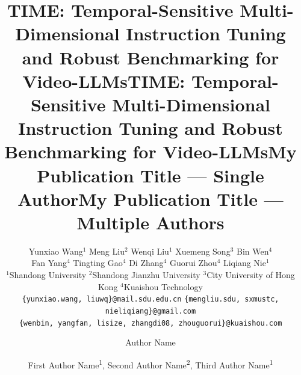 \documentclass[letterpaper]{article} %
\title{TIME: Temporal-Sensitive Multi-Dimensional Instruction Tuning and Robust Benchmarking for Video-LLMs}
\title{TIME: Temporal-Sensitive Multi-Dimensional Instruction Tuning and Robust Benchmarking for Video-LLMs}
\author{
    Yunxiao Wang$^1$ \qquad Meng Liu$^2$ \qquad Wenqi Liu$^1$ \qquad Xuemeng Song$^3$ \qquad Bin Wen$^4$\\
    Fan Yang$^4$ \qquad Tingting Gao$^4$ \qquad Di Zhang$^4$ \qquad Guorui Zhou$^4$ \qquad Liqiang Nie$^1$\\
    \small{$^1$Shandong University} \qquad
    \small{$^2$Shandong Jianzhu University} \qquad
    \small{$^3$City University of Hong Kong} \qquad
    \small{$^4$Kuaishou Technology}\\
    {\tt\small \{yunxiao.wang, liuwq\}@mail.sdu.edu.cn}
    {\tt\small \{mengliu.sdu, sxmustc, nieliqiang\}@gmail.com}\\
    {\tt\small \{wenbin, yangfan, lisize, zhangdi08, zhouguorui\}@kuaishou.com}
}
\title{My Publication Title --- Single Author}
\author {
    Author Name
}
\title{My Publication Title --- Multiple Authors}
\author {
    First Author Name\textsuperscript{\rm 1},
    Second Author Name\textsuperscript{\rm 2},
    Third Author Name\textsuperscript{\rm 1}
}
\begin{document}
\maketitle



\ifdefined\aaaianonymous
\else






\end{document}
